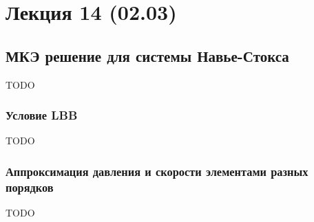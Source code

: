 \section{Лекция 14 (02.03)}

\subsection{МКЭ решение для системы Навье-Стокса}
TODO
\subsubsection{Условие LBB}
TODO
\subsubsection{Аппроксимация давления и скорости элементами разных порядков}
TODO
